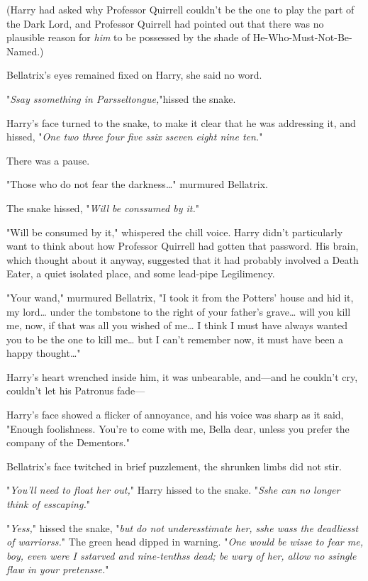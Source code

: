 (Harry had asked why Professor Quirrell couldn't be the one to play the part of 
the Dark Lord, and Professor Quirrell had pointed out that there was no 
plausible reason for \emph{him} to be possessed by the shade of 
He-Who-Must-Not-Be-Named.)

Bellatrix's eyes remained fixed on Harry, she said no word.

"\emph{Ssay ssomething in Parsseltongue,}"hissed the snake.

Harry's face turned to the snake, to make it clear that he was addressing it, 
and hissed, "\emph{One two three four five ssix sseven eight nine ten.}"

There was a pause.

"Those who do not fear the darkness{\ldots}" murmured Bellatrix.

The snake hissed, "\emph{Will be conssumed by it.}"

"Will be consumed by it," whispered the chill voice. Harry didn't particularly 
want to think about how Professor Quirrell had gotten that password. His brain, 
which thought about it anyway, suggested that it had probably involved a Death 
Eater, a quiet isolated place, and some lead-pipe Legilimency.

"Your wand," murmured Bellatrix, "I took it from the Potters' house and hid it, 
my lord{\ldots} under the tombstone to the right of your father's grave{\ldots} 
will you kill me, now, if that was all you wished of me{\ldots} I think I must 
have always wanted you to be the one to kill me{\ldots} but I can't remember 
now, it must have been a happy thought{\ldots}"

Harry's heart wrenched inside him, it was unbearable, and---and he couldn't 
cry, couldn't let his Patronus fade---

Harry's face showed a flicker of annoyance, and his voice was sharp as it said, 
"Enough foolishness. You're to come with me, Bella dear, unless you prefer the 
company of the Dementors."

Bellatrix's face twitched in brief puzzlement, the shrunken limbs did not stir.

"\emph{You'll need to float her out,}" Harry hissed to the snake. "\emph{Sshe 
can no longer think of esscaping.}"

"\emph{Yess,}" hissed the snake, "\emph{but do not underesstimate her, sshe 
wass the deadliesst of warriorss.}" The green head dipped in warning. 
"\emph{One would be wisse to fear me, boy, even were I sstarved and 
nine-tenthss dead; be wary of her, allow no ssingle flaw in your pretensse.}"

